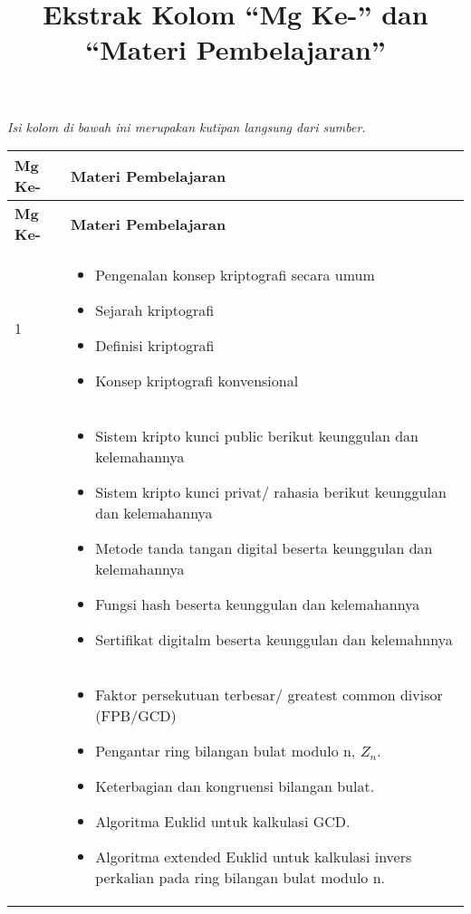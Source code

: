 \documentclass[11pt,a4paper]{article}
\title{Ekstrak Kolom \textquotedblleft Mg Ke-\textquotedblright{} dan \textquotedblleft Materi Pembelajaran\textquotedblright{}}
\date{}
\begin{document}
\maketitle

\noindent\textit{Isi kolom di bawah ini merupakan kutipan langsung dari sumber.}

\renewcommand\arraystretch{1.2}
\setlength{\LTpre}{10pt}
\setlength{\LTpost}{10pt}

\begin{longtable}{>{\raggedright\arraybackslash}p{} >{\raggedright\arraybackslash}p{}}
\textbf{Mg Ke-} & \textbf{Materi Pembelajaran} \\ \hline
\endfirsthead
\textbf{Mg Ke-} & \textbf{Materi Pembelajaran} \\ \hline
\endhead

1 & \begin{itemize}
\item Pengenalan konsep kriptografi secara umum
\item Sejarah kriptografi
\item Definisi kriptografi
\item Konsep kriptografi konvensional
\end{itemize} \\

2 & \begin{itemize}
\item Sistem kripto kunci public berikut keunggulan dan kelemahannya
\item Sistem kripto kunci privat/ rahasia berikut keunggulan dan kelemahannya
\item Metode tanda tangan digital beserta keunggulan dan kelemahannya
\item Fungsi hash beserta keunggulan dan kelemahannya
\item Sertifikat digitalm beserta keunggulan dan kelemahnnya
\end{itemize} \\

3 & \begin{itemize}
\item Faktor persekutuan terbesar/ greatest common divisor (FPB/GCD)
\item Pengantar ring bilangan bulat modulo n, $Z_{n}$.
\item Keterbagian dan kongruensi bilangan bulat.
\item Algoritma Euklid untuk kalkulasi GCD.
\item Algoritma extended Euklid untuk kalkulasi invers perkalian pada ring bilangan bulat modulo n.
\end{itemize} \\


\end{longtable}
\end{document}
